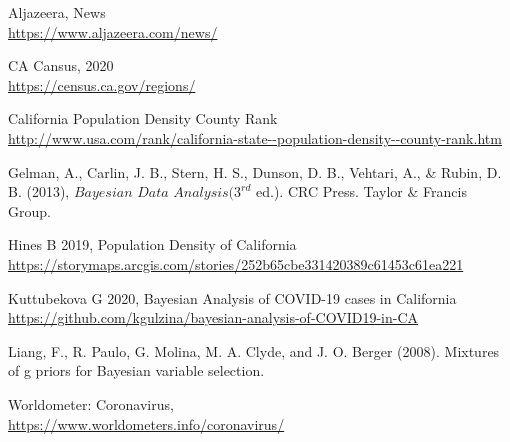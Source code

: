 \documentclass[11pt,twocolumn]{asaproc}
\begin{document}
\begin{references}
\itemsep=0pt
{\footnotesize

\item
Aljazeera, News
\\\url{https://www.aljazeera.com/news/}

\item
CA Cansus, 2020
\\\url{https://census.ca.gov/regions/}

\item
California Population Density County Rank
\\\url{http://www.usa.com/rank/california-state--population-density--county-rank.htm}

\item 
Gelman, A., Carlin, J. B., Stern, H. S., Dunson, D. B., Vehtari, A., \& Rubin, D. B. (2013), $\textit{Bayesian Data Analysis} (3^{rd}$ ed.). CRC Press. Taylor \& Francis Group.

\item
Hines B 2019, Population Density of California
\\\url{https://storymaps.arcgis.com/stories/252b65cbe331420389c61453c61ea221}

\item
Kuttubekova G 2020, Bayesian Analysis of COVID-19 cases in California
\\\url{https://github.com/kgulzina/bayesian-analysis-of-COVID19-in-CA}

\item 
Liang, F., R. Paulo, G. Molina, M. A. Clyde, and J. O. Berger (2008). Mixtures of g priors for Bayesian variable selection.


\item 
Worldometer: Coronavirus,
\\\url{https://www.worldometers.info/coronavirus/}


}
\end{references}
\end{document}
